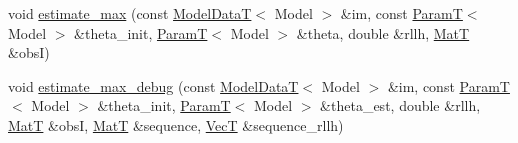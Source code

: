 \begin{DoxyCompactItemize}
\item 
void \hyperlink{classmappel_1_1Estimator_a8f85cf26c72c34d0071ccd2f8bb56abd}{estimate\+\_\+max} (const \hyperlink{namespacemappel_a97f050df953605381ae9c901c3b125f1}{Model\+DataT}$<$ Model $>$ \&im, const \hyperlink{namespacemappel_a667925cb0d6c0e49f2f035cc5a9a6857}{ParamT}$<$ Model $>$ \&theta\+\_\+init, \hyperlink{namespacemappel_a667925cb0d6c0e49f2f035cc5a9a6857}{ParamT}$<$ Model $>$ \&theta, double \&rllh, \hyperlink{namespacemappel_a7091ab87c528041f7e2027195fad8915}{MatT} \&obsI)
\item 
void \hyperlink{classmappel_1_1Estimator_a4a581372a320f1c13eeffacf6309911b}{estimate\+\_\+max\+\_\+debug} (const \hyperlink{namespacemappel_a97f050df953605381ae9c901c3b125f1}{Model\+DataT}$<$ Model $>$ \&im, const \hyperlink{namespacemappel_a667925cb0d6c0e49f2f035cc5a9a6857}{ParamT}$<$ Model $>$ \&theta\+\_\+init, \hyperlink{namespacemappel_a667925cb0d6c0e49f2f035cc5a9a6857}{ParamT}$<$ Model $>$ \&theta\+\_\+est, double \&rllh, \hyperlink{namespacemappel_a7091ab87c528041f7e2027195fad8915}{MatT} \&obsI, \hyperlink{namespacemappel_a7091ab87c528041f7e2027195fad8915}{MatT} \&sequence, \hyperlink{namespacemappel_a2225ad69f358daa3f4f99282a35b9a3a}{VecT} \&sequence\+\_\+rllh)
\end{DoxyCompactItemize}
